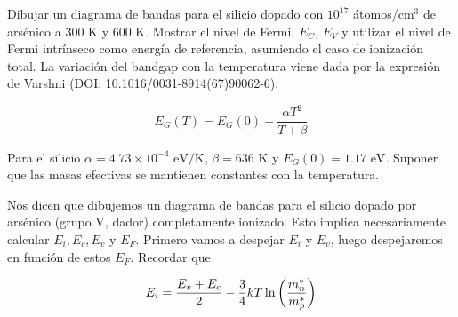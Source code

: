 \begin{texercise}
	Dibujar un diagrama de bandas para el silicio dopado con $10^{17}$ átomos/cm$^3$ de arsénico a 300 K y 600 K. Mostrar el nivel de Fermi, $E_C$, $E_V$ y utilizar el nivel de Fermi intrínseco como energía de referencia, asumiendo el caso de ionización total. La variación del bandgap con la temperatura viene dada por la expresión de Varshni (DOI: 10.1016/0031-8914(67)90062-6):

	\begin{equation}
		E_G(T) = E_G(0) - \frac{\alpha T^2}{T + \beta}
	\end{equation}

	Para el silicio $\alpha = 4.73 \times 10^{-4} \text{ eV/K}$, $\beta = 636 \text{ K}$ y $E_G(0) = 1.17 \text{ eV}$. Suponer que las masas efectivas se mantienen constantes con la temperatura.

	\tcblower

	Nos dicen que dibujemos un diagrama de bandas para el silicio dopado por arsénico (grupo V, dador) completamente ionizado. Esto implica necesariamente calcular $E_i,E_c,E_v$ y $E_F$. Primero vamos a despejar $E_i$ y $E_v$, luego despejaremos en función de estos $E_F$. Recordar que

	\begin{equation}
		E_i = \frac{E_v+E_c}{2} - \frac{3}{4} kT \ln\left( \frac{m_n^*}{m_p^*} \right)
	\end{equation}


\end{texercise}
